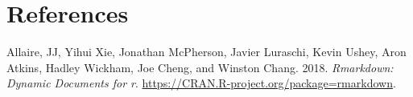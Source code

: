 \documentclass[11pt,a4paper,]{article}
\begin{document}
\section*{References}\label{references}

\label{refs}
\begin{CSLReferences}{1}{0}
Allaire, JJ, Yihui Xie, Jonathan McPherson, Javier Luraschi, Kevin
Ushey, Aron Atkins, Hadley Wickham, Joe Cheng, and Winston Chang. 2018.
\emph{Rmarkdown: Dynamic Documents for r}.
\url{https://CRAN.R-project.org/package=rmarkdown}.

\end{CSLReferences}
\end{document}
